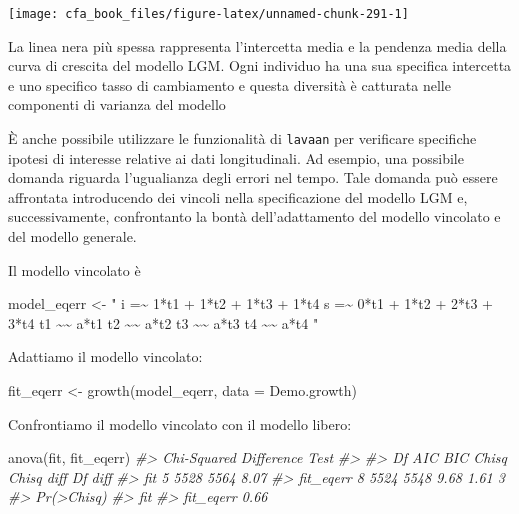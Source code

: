 \documentclass[
  11pt,
]{krantz}
\makeatletter
\newenvironment{Shaded}{\begin{snugshade}}{\end{snugshade}}
\newcommand{\AttributeTok}[1]{\textcolor[rgb]{0.61,0.61,0.61}{#1}}
\newcommand{\CommentTok}[1]{\textcolor[rgb]{0.37,0.37,0.37}{\textit{#1}}}
\newcommand{\FunctionTok}[1]{\textcolor[rgb]{0,0,0}{#1}}
\newcommand{\NormalTok}[1]{#1}
\newcommand{\OtherTok}[1]{\textcolor[rgb]{0.37,0.37,0.37}{#1}}
\newcommand{\StringTok}[1]{\textcolor[rgb]{0.5,0.5,0.5}{#1}}
\newenvironment{kframe}{%
\medskip{}
\setlength{\fboxsep}{.8em}
 \def\at@end@of@kframe{}%
 \ifinner\ifhmode%
  \def\at@end@of@kframe{\end{minipage}}%
  \begin{minipage}{\columnwidth}%
 \fi\fi%
 \def\FrameCommand##1{\hskip\@totalleftmargin \hskip-\fboxsep
 \colorbox{shadecolor}{##1}\hskip-\fboxsep
     \hskip-\linewidth \hskip-\@totalleftmargin \hskip\columnwidth}%
 \MakeFramed {\advance\hsize-\width
   \@totalleftmargin\z@ \linewidth\hsize
   \@setminipage}}%
 {\par\unskip\endMakeFramed%
 \at@end@of@kframe}
\renewenvironment{Shaded}{\begin{kframe}}{\end{kframe}}
\theoremstyle{definition}
\theoremstyle{definition}
\theoremstyle{definition}
\theoremstyle{definition}
\theoremstyle{remark}
\makeatother
\begin{document}
\begin{center}\texttt{[image: cfa\_book\_files/figure-latex/unnamed-chunk-291-1]} \end{center}

La linea nera più spessa rappresenta l'intercetta media e la pendenza media della curva di crescita del modello LGM. Ogni individuo ha una sua specifica intercetta e uno specifico tasso di cambiamento e questa diversità è catturata nelle componenti di varianza del modello

È anche possibile utilizzare le funzionalità di \texttt{lavaan} per verificare specifiche ipotesi di interesse relative ai dati longitudinali. Ad esempio, una possibile domanda riguarda l'ugualianza degli errori nel tempo. Tale domanda può essere affrontata introducendo dei vincoli nella specificazione del modello LGM e, successivamente, confrontanto la bontà dell'adattamento del modello vincolato e del modello generale.

Il modello vincolato è

\begin{Shaded}
\begin{Highlighting}[]
\NormalTok{model\_eqerr }\OtherTok{\textless{}{-}} \StringTok{"}
\StringTok{ i =\textasciitilde{} 1*t1 + 1*t2 + 1*t3 + 1*t4}
\StringTok{ s =\textasciitilde{} 0*t1 + 1*t2 + 2*t3 + 3*t4}
\StringTok{ t1 \textasciitilde{}\textasciitilde{} a*t1}
\StringTok{ t2 \textasciitilde{}\textasciitilde{} a*t2}
\StringTok{ t3 \textasciitilde{}\textasciitilde{} a*t3}
\StringTok{ t4 \textasciitilde{}\textasciitilde{} a*t4}
\StringTok{"}
\end{Highlighting}
\end{Shaded}

Adattiamo il modello vincolato:

\begin{Shaded}
\begin{Highlighting}[]
\NormalTok{fit\_eqerr }\OtherTok{\textless{}{-}} \FunctionTok{growth}\NormalTok{(model\_eqerr, }\AttributeTok{data =}\NormalTok{ Demo.growth)}
\end{Highlighting}
\end{Shaded}

Confrontiamo il modello vincolato con il modello libero:

\begin{Shaded}
\begin{Highlighting}[]
\FunctionTok{anova}\NormalTok{(fit, fit\_eqerr)}
\CommentTok{\#\textgreater{} Chi{-}Squared Difference Test}
\CommentTok{\#\textgreater{} }
\CommentTok{\#\textgreater{}           Df  AIC  BIC Chisq Chisq diff Df diff}
\CommentTok{\#\textgreater{} fit        5 5528 5564  8.07                   }
\CommentTok{\#\textgreater{} fit\_eqerr  8 5524 5548  9.68       1.61       3}
\CommentTok{\#\textgreater{}           Pr(\textgreater{}Chisq)}
\CommentTok{\#\textgreater{} fit                 }
\CommentTok{\#\textgreater{} fit\_eqerr       0.66}
\end{Highlighting}
\end{Shaded}
\end{document}
